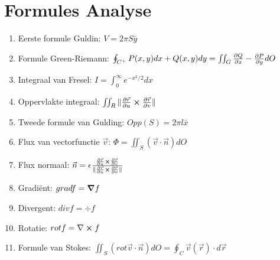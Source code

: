 \documentclass[12pt]{article}
\begin{document}
    \maketitle

    \section{Formules Analyse}
    \label{sec:formules_analyse}
   
    \begin{enumerate}
	    \item Eerste formule Guldin: $ V = 2\pi S \bar{y}$
	    \item Formule Green-Riemann: $ \oint_{C^+} P(x, y)dx + Q(x, y)dy = \iint_G \pdv{Q}{x} - \pdv{P}{y} dO $
	    \item Integraal van Fresel: $ I = \int_0^{\infty} e^{-x^2/2} dx$
    	    \item Oppervlakte integraal:  $ \iint_R \| \pdv{\vec{r}}{u} \cross \pdv{\vec{r}}{v} \| $
            \item Tweede formule van Gulding: $ Opp(S) = 2\pi l \bar{x}$
	    \item Flux van vectorfunctie $ \vec{v}$: $ \Phi = \iint_S (\vec{v} \cdot \vec{n}) dO$
	    \item Flux normaal: $\vec{n} = \epsilon \frac{\pdv{\vec{r}}{u} \cross \pdv{\vec{r}}{v}}{\| \pdv{\vec{r}}{u} \cross \pdv{\vec{r}}{v} \| }$
	    \item Gradi\"ent: $ grad f = \grad f$
	    \item Divergent: $ div f = \div f $
	    \item Rotatie: $ rot f = \nabla \cross f $
	    \item Formule van Stokes:  $ \iint_S (rot \vec{ v}\cdot \vec{n}) dO = \oint_C \vec{v}(\vec{r}) \cdot d \vec{r} $
    \end{enumerate}
    
\end{document}
